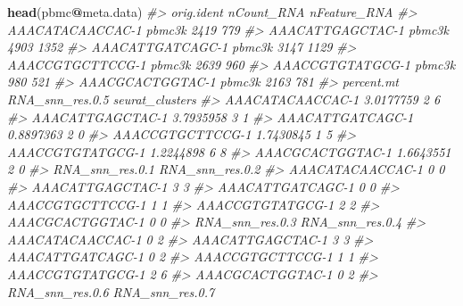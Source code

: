 \documentclass[
]{book}
\newenvironment{Shaded}{\begin{snugshade}}{\end{snugshade}}
\newcommand{\CommentTok}[1]{\textcolor[rgb]{0.56,0.35,0.01}{\textit{#1}}}
\newcommand{\FunctionTok}[1]{\textcolor[rgb]{0.13,0.29,0.53}{\textbf{#1}}}
\newcommand{\NormalTok}[1]{#1}
\newcommand{\SpecialCharTok}[1]{\textcolor[rgb]{0.81,0.36,0.00}{\textbf{#1}}}
\begin{document}
\begin{Shaded}
\begin{Highlighting}[]
\FunctionTok{head}\NormalTok{(pbmc}\SpecialCharTok{@}\NormalTok{meta.data)}
\CommentTok{\#\textgreater{}                  orig.ident nCount\_RNA nFeature\_RNA}
\CommentTok{\#\textgreater{} AAACATACAACCAC{-}1     pbmc3k       2419          779}
\CommentTok{\#\textgreater{} AAACATTGAGCTAC{-}1     pbmc3k       4903         1352}
\CommentTok{\#\textgreater{} AAACATTGATCAGC{-}1     pbmc3k       3147         1129}
\CommentTok{\#\textgreater{} AAACCGTGCTTCCG{-}1     pbmc3k       2639          960}
\CommentTok{\#\textgreater{} AAACCGTGTATGCG{-}1     pbmc3k        980          521}
\CommentTok{\#\textgreater{} AAACGCACTGGTAC{-}1     pbmc3k       2163          781}
\CommentTok{\#\textgreater{}                  percent.mt RNA\_snn\_res.0.5 seurat\_clusters}
\CommentTok{\#\textgreater{} AAACATACAACCAC{-}1  3.0177759               2               6}
\CommentTok{\#\textgreater{} AAACATTGAGCTAC{-}1  3.7935958               3               1}
\CommentTok{\#\textgreater{} AAACATTGATCAGC{-}1  0.8897363               2               0}
\CommentTok{\#\textgreater{} AAACCGTGCTTCCG{-}1  1.7430845               1               5}
\CommentTok{\#\textgreater{} AAACCGTGTATGCG{-}1  1.2244898               6               8}
\CommentTok{\#\textgreater{} AAACGCACTGGTAC{-}1  1.6643551               2               0}
\CommentTok{\#\textgreater{}                  RNA\_snn\_res.0.1 RNA\_snn\_res.0.2}
\CommentTok{\#\textgreater{} AAACATACAACCAC{-}1               0               0}
\CommentTok{\#\textgreater{} AAACATTGAGCTAC{-}1               3               3}
\CommentTok{\#\textgreater{} AAACATTGATCAGC{-}1               0               0}
\CommentTok{\#\textgreater{} AAACCGTGCTTCCG{-}1               1               1}
\CommentTok{\#\textgreater{} AAACCGTGTATGCG{-}1               2               2}
\CommentTok{\#\textgreater{} AAACGCACTGGTAC{-}1               0               0}
\CommentTok{\#\textgreater{}                  RNA\_snn\_res.0.3 RNA\_snn\_res.0.4}
\CommentTok{\#\textgreater{} AAACATACAACCAC{-}1               0               2}
\CommentTok{\#\textgreater{} AAACATTGAGCTAC{-}1               3               3}
\CommentTok{\#\textgreater{} AAACATTGATCAGC{-}1               0               2}
\CommentTok{\#\textgreater{} AAACCGTGCTTCCG{-}1               1               1}
\CommentTok{\#\textgreater{} AAACCGTGTATGCG{-}1               2               6}
\CommentTok{\#\textgreater{} AAACGCACTGGTAC{-}1               0               2}
\CommentTok{\#\textgreater{}                  RNA\_snn\_res.0.6 RNA\_snn\_res.0.7}

\end{Highlighting}
\end{Shaded}
\end{document}
